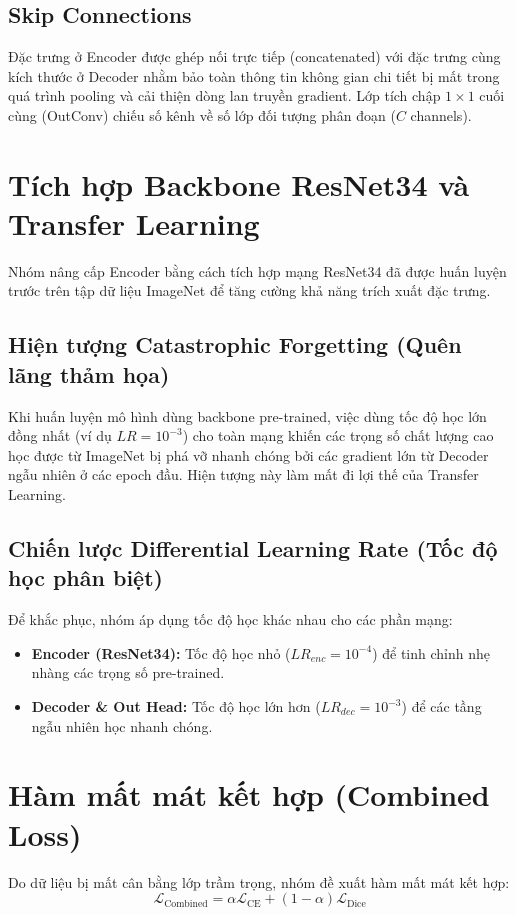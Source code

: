 \documentclass[a4paper,12pt]{report}
\begin{document}
\subsection{Skip Connections}
Đặc trưng ở Encoder được ghép nối trực tiếp (concatenated) với đặc trưng cùng kích thước ở Decoder nhằm bảo toàn thông tin không gian chi tiết bị mất trong quá trình pooling và cải thiện dòng lan truyền gradient. Lớp tích chập $1\times1$ cuối cùng (OutConv) chiếu số kênh về số lớp đối tượng phân đoạn ($C$ channels).

\section{Tích hợp Backbone ResNet34 và Transfer Learning}
Nhóm nâng cấp Encoder bằng cách tích hợp mạng ResNet34 đã được huấn luyện trước trên tập dữ liệu ImageNet để tăng cường khả năng trích xuất đặc trưng.

\subsection{Hiện tượng Catastrophic Forgetting (Quên lãng thảm họa)}
Khi huấn luyện mô hình dùng backbone pre-trained, việc dùng tốc độ học lớn đồng nhất (ví dụ $LR = 10^{-3}$) cho toàn mạng khiến các trọng số chất lượng cao học được từ ImageNet bị phá vỡ nhanh chóng bởi các gradient lớn từ Decoder ngẫu nhiên ở các epoch đầu. Hiện tượng này làm mất đi lợi thế của Transfer Learning.

\subsection{Chiến lược Differential Learning Rate (Tốc độ học phân biệt)}
Để khắc phục, nhóm áp dụng tốc độ học khác nhau cho các phần mạng:
\begin{itemize}
    \item \textbf{Encoder (ResNet34):} Tốc độ học nhỏ ($LR_{enc} = 10^{-4}$) để tinh chỉnh nhẹ nhàng các trọng số pre-trained.
    \item \textbf{Decoder \& Out Head:} Tốc độ học lớn hơn ($LR_{dec} = 10^{-3}$) để các tầng ngẫu nhiên học nhanh chóng.
\end{itemize}

\section{Hàm mất mát kết hợp (Combined Loss)}
Do dữ liệu bị mất cân bằng lớp trầm trọng, nhóm đề xuất hàm mất mát kết hợp:
$$\mathcal{L}_{\text{Combined}} = \alpha \mathcal{L}_{\text{CE}} + (1 - \alpha) \mathcal{L}_{\text{Dice}}$$
\end{document}
